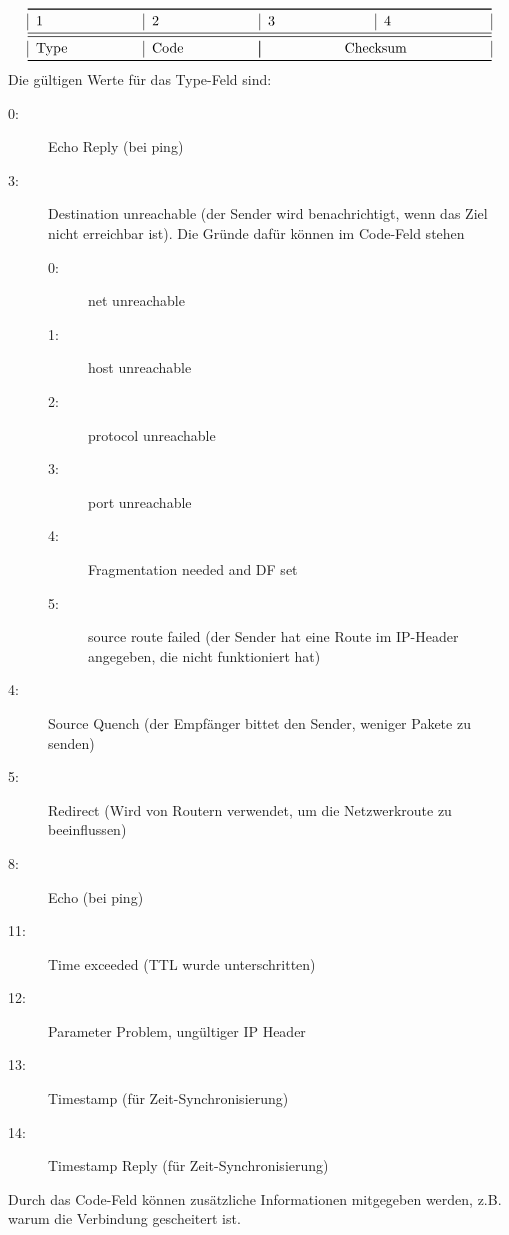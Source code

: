 \documentclass[a4paper,10pt]{scrartcl}
\begin{document}
        \[
        \begin{tabular}{|p{2.5cm}|p{2.5cm}|p{2.5cm}|p{2.5cm}|}    
            \toprule 
            1 & 2 & 3 & 4  \\
            \midrule\midrule
            Type & Code & \multicolumn{2}{|c|}{Checksum}\\
            \bottomrule
        \end{tabular}
        \]
        Die gültigen Werte für das Type-Feld sind:
        \begin{description}
            \item[0:] Echo Reply (bei ping)
            \item[3:] Destination unreachable (der Sender wird benachrichtigt, wenn das Ziel nicht erreichbar ist). Die Gründe dafür können im Code-Feld stehen
            \begin{description}
            \item[0:] net unreachable
            \item[1:] host unreachable
            \item[2:] protocol unreachable
            \item[3:] port unreachable
            \item[4:] Fragmentation needed and DF set
            \item[5:] source route failed (der Sender hat eine Route im IP-Header angegeben, die nicht funktioniert hat)
            \end{description}
            \item[4:] Source Quench (der Empfänger bittet den Sender, weniger Pakete zu senden)
            \item[5:] Redirect (Wird von Routern verwendet, um die Netzwerkroute zu beeinflussen)
            \item[8:] Echo (bei ping)
            \item[11:] Time exceeded (TTL wurde unterschritten)
            \item[12:] Parameter Problem, ungültiger IP Header
            \item[13:] Timestamp (für Zeit-Synchronisierung)
            \item[14:] Timestamp Reply (für Zeit-Synchronisierung)
        \end{description}
        Durch das Code-Feld können zusätzliche Informationen mitgegeben werden, z.B. warum die Verbindung gescheitert ist.
\end{document}
